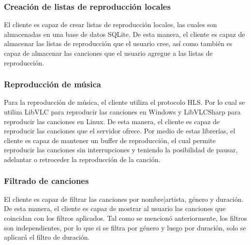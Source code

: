 \subsubsection{Creación de listas de reproducción locales}

El cliente es capaz de crear listas de reproducción locales, las cuales son
almacenadas en una base de datos SQLite. De esta manera, el cliente es capaz de
almacenar las listas de reproducción que el usuario cree, así como también es
capaz de almacenar las canciones que el usuario agregue a las listas de
reproducción.

\subsubsection{Reproducción de música}

Para la reproducción de música, el cliente utiliza el protocolo HLS. Por lo cual 
se utiliza LibVLC para reproducir las canciones en Windows y LibVLCSharp para
reproducir las canciones en Linux. De esta manera, el cliente es capaz de
reproducir las canciones que el servidor ofrece. Por medio de estas librerías,
el cliente es capaz de mantener un buffer de reproducción, el cual permite
reproducir las canciones sin interrupciones y teniendo la posibilidad 
de pausar, adelantar o retroceder la reproducción de la canción.

\subsubsection{Filtrado de canciones}

El cliente es capaz de filtrar las canciones por nombre|artista, género y
duración. De esta manera, el cliente es capaz de mostrar al usuario las
canciones que coincidan con los filtros aplicados. Tal como se mencionó
anteriormente, los filtros son independientes, por lo que si se filtra por
género y luego por duración, solo se aplicará el filtro de duración.
